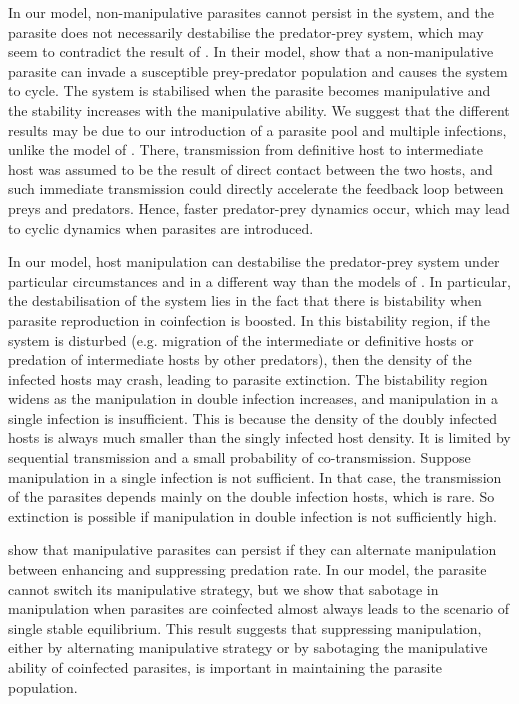 \documentclass[11pt]{article}
\begin{document}
In our model, non-manipulative parasites cannot persist in the system, and the parasite does not necessarily destabilise the predator-prey system, which may seem to contradict the result of \cite{Rogawa2018}.
In their model, \cite{Rogawa2018} show that a non-manipulative parasite can invade a susceptible prey-predator population and causes the system to cycle. 
The system is stabilised when the parasite becomes manipulative and the stability increases with the manipulative ability.
We suggest that the different results may be due to our introduction of a parasite pool and multiple infections, unlike the model of \cite{Rogawa2018}. There, transmission from definitive host to intermediate host was assumed to be the result of direct contact between the two hosts, and such immediate transmission could directly accelerate the feedback loop between preys and predators. 
Hence, faster predator-prey dynamics occur, which may lead to cyclic dynamics when parasites are introduced.


In our model, host manipulation can destabilise the predator-prey system under particular circumstances and in a different way than the models of \cite{Rogawa2018}. 
In particular, the destabilisation of the system lies in the fact that there is bistability when parasite reproduction in coinfection is boosted. 
In this bistability region, if the system is disturbed (e.g. migration of the intermediate or definitive hosts or predation of intermediate hosts by other predators), then the density of the infected hosts may crash, leading to parasite extinction. 
The bistability region widens as the manipulation in double infection increases, and manipulation in a single infection is insufficient. 
This is because the density of the doubly infected hosts is always much smaller than the singly infected host density. 
It is limited by sequential transmission and a small probability of co-transmission. 
Suppose manipulation in a single infection is not sufficient. 
In that case, the transmission of the parasites depends mainly on the double infection hosts, which is rare. 
So extinction is possible if manipulation in double infection is not sufficiently high.

\cite{Iritani2018} show that manipulative parasites can persist if they can alternate manipulation between enhancing and suppressing predation rate. 
In our model, the parasite cannot switch its manipulative strategy, but we show that sabotage in manipulation when parasites are coinfected almost always leads to the scenario of single stable equilibrium. This result suggests that suppressing manipulation, either by alternating manipulative strategy or by sabotaging the manipulative ability of coinfected parasites, is important in maintaining the parasite population. 
\end{document}
